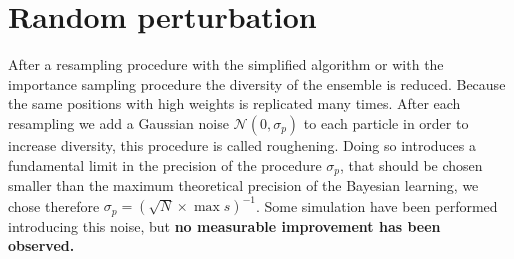 \documentclass[aps, pra, 10pt, twocolumn, superscriptaddress,floatfix]{revtex4-1}
\begin{document}
\section{Random perturbation}
%
After a resampling procedure with the simplified algorithm or with the importance sampling procedure the diversity of the ensemble is reduced. Because the same positions with high weights is replicated many times. After each resampling we add a Gaussian noise $\mathcal{N} (0, \sigma_p)$ to each particle in order to increase diversity, this procedure is called roughening. Doing so introduces a fundamental limit in the precision of the procedure $\sigma_p$, that should be chosen smaller than the maximum theoretical precision of the Bayesian learning, we chose therefore $\sigma_p = (\sqrt{N} \times \max s)^{-1}$. Some simulation have been performed introducing this noise, but \textbf{no measurable improvement has been observed.}
\end{document}
